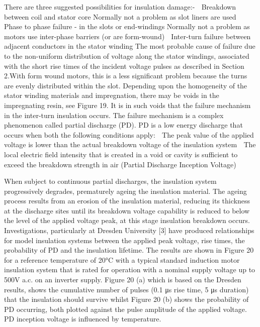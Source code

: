 There are three suggested possibilities for insulation damage:-
 Breakdown between coil and stator core
Normally not a problem as slot liners are used
 Phase to phase failure - in the slots or end-windings
Normally not a problem as motors use inter-phase barriers (or are form-wound)
 Inter-turn failure between adjacent conductors in the stator winding
The most probable cause of failure due to the non-uniform distribution of voltage
along the stator windings, associated with the short rise times of the incident
voltage pulses as described in Section 2.With form wound motors, this is a less
significant problem because the turns are evenly distributed within the slot.
Depending upon the homogeneity of the stator winding materials and impregnation, there may
be voids in the impregnating resin, see Figure 19. It is in such voids that the failure mechanism
in the inter-turn insulation occurs. The failure mechanism is a complex phenomenon called
partial discharge (PD).
PD is a low energy discharge that occurs when both the following conditions apply:
 The peak value of the applied voltage is lower than the actual breakdown voltage of
the insulation system
 The local electric field intensity that is created in a void or cavity is sufficient to
exceed the breakdown strength in air (Partial Discharge Inception Voltage)

When subject to continuous partial discharges, the insulation system progressively degrades,
prematurely ageing the insulation material. The ageing process results from an erosion of the
insulation material, reducing its thickness at the discharge sites until its breakdown voltage
capability is reduced to below the level of the applied voltage peak, at this stage insulation
breakdown occurs.
Investigations, particularly at Dresden University [3] have produced relationships for model
insulation systems between the applied peak voltage, rise times, the probability of PD and the
insulation lifetime. The results are shown in Figure 20 for a reference temperature of 20°C with
a typical standard induction motor insulation system that is rated for operation with a nominal
supply voltage up to 500V a.c. on an inverter supply.
Figure 20 (a) which is based on the Dresden results, shows the cumulative number of pulses
(0.1 μs rise time, 5 μs duration) that the insulation should survive whilst Figure 20 (b) shows
the probability of PD occurring, both plotted against the pulse amplitude of the applied voltage.
PD inception voltage is influenced by temperature.

